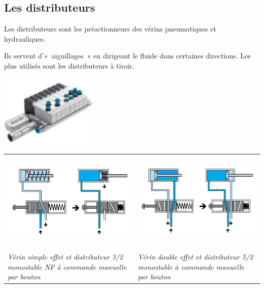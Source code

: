 \subsection{Les distributeurs}

Les distributeurs sont les préactionneurs des vérins pneumatiques et
hydrauliques.

Ils servent d'«~aiguillages~» en dirigeant le fluide dans certaines
directions. Les plus utilisés sont les distributeurs à tiroir. 

\includegraphics[width=1.81782in,height=1.36364in]{media/image111.png}

\begin{tabular}{p{.45\linewidth}p{.45\linewidth}}
\includegraphics[width=3.14961in,height=1.88001in]{media/image112.png} & 
\includegraphics[width=3.14961in,height=1.85091in]{media/image113.png} \\

\emph{Vérin simple effet et distributeur 3/2 monostable NF à commande
manuelle par bouton} &
\emph{Vérin double effet et distributeur 5/2 monostable à commande
manuelle par bouton} \\
\end{tabular}


